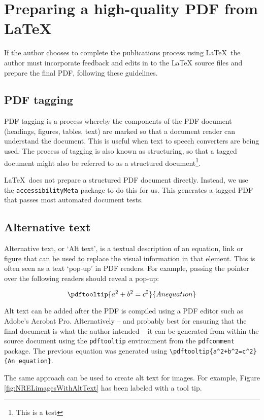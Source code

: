 \section{Preparing a high-quality PDF from LaTeX}\label{sec:PDFprep}
If the author chooses to complete the publications process using LaTeX\, the author must incorporate feedback and edits in to the LaTeX source files and prepare the final PDF, following these guidelines.

\subsection{PDF tagging}\label{sec:PDFtagging}
PDF tagging is a process whereby the components of the PDF document (headings, figures, tables, text) are marked so that a document reader can understand the document. This is useful when text to speech converters are being used. The process of tagging is also known as structuring, so that a tagged document might also be referred to as a structured document\footnote{This is a test}.

\LaTeX\ does not prepare a structured PDF document directly. Instead, we use the \texttt{accessibilityMeta} package to do this for us. This generates a tagged PDF that passes most automated document tests.

\subsection{Alternative text}\label{sec:Alttext}
Alternative text, or `Alt text', is a textual description of an equation, link or figure that can be used to replace the visual information in that element. This is often seen as a text `pop-up' in PDF readers. For example, passing the pointer over the following readers should reveal a pop-up:

\begin{equation}
\pdftooltip{a^2+b^2=c^2}{An equation}
\end{equation}

Alt text can be added after the PDF is compiled using a PDF editor such as Adobe's Acrobat Pro. Alternatively -- and probably best for ensuring that the final document is what the author intended -- it can be generated from within the source document using the \texttt{pdftooltip} environment from the \texttt{pdfcomment} package. The previous equation was generated using \verb?\pdftooltip{a^2+b^2=c^2}{An equation}?.

The same approach can be used to create alt text for images. For example, Figure \ref{fig:NRELimagesWithAltText} has been labeled with a tool tip. 

